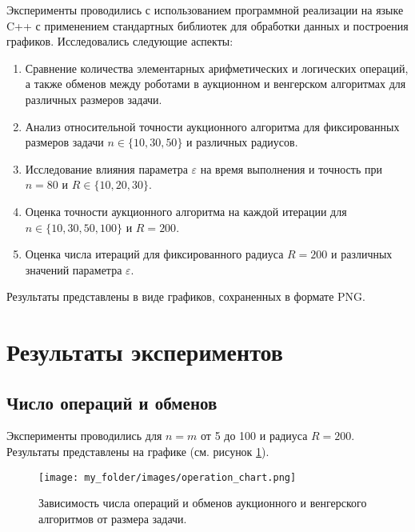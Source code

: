 Эксперименты проводились с использованием программной реализации на языке C++ с применением стандартных библиотек для обработки данных и построения графиков. Исследовались следующие аспекты:

\begin{enumerate}
    \item Сравнение количества элементарных арифметических и логических операций, а также обменов между роботами в аукционном и венгерском алгоритмах для различных размеров задачи.
    \item Анализ относительной точности аукционного алгоритма для фиксированных размеров задачи \( n \in \{10, 30, 50\} \) и различных радиусов.
    \item Исследование влияния параметра \( \varepsilon \) на время выполнения и точность при \( n = 80 \) и \( R \in \{10, 20, 30\} \).
    \item Оценка точности аукционного алгоритма на каждой итерации для \( n \in \{10, 30, 50, 100\} \) и \( R = 200 \).
    \item Оценка числа итераций для фиксированного радиуса \( R = 200 \) и различных значений параметра \( \varepsilon \).
\end{enumerate}

Результаты представлены в виде графиков, сохраненных в формате PNG.

\section{Результаты экспериментов}

\subsection{Число операций и обменов}

\vspace{0.3cm}

Эксперименты проводились для \( n = m \) от 5 до 100 и радиуса \( R = 200 \). Результаты представлены на графике (см. рисунок \ref{fig:opeartion_chart}).

\begin{figure}[h]
    \centering
    \texttt{[image: my\_folder/images/operation\_chart.png]}
    \caption{Зависимость числа операций и обменов аукционного и венгерского алгоритмов от размера задачи.}
    \label{fig:opeartion_chart}
\end{figure}

\vspace{0.3cm}


